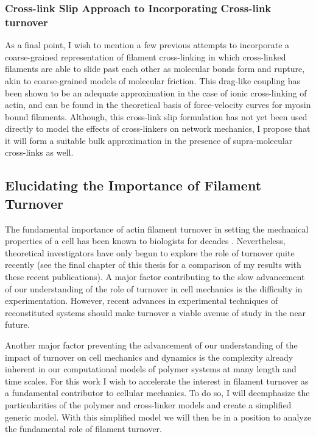 \subsubsection{Cross-link Slip Approach to Incorporating Cross-link turnover}

As a final point, I wish to mention a few previous attempts to incorporate a coarse-grained representation of filament cross-linking in which cross-linked filaments are able to slide past each other as molecular bonds form and rupture, akin to coarse-grained models of molecular friction\cite{theo_friction,theo_frictionSam,theo_molefric}.  This drag-like coupling has been shown to be an adequate approximation in the case of ionic cross-linking of actin\cite{mol_fric,theo_hydroish2}, and can be found in the theoretical basis of force-velocity curves for myosin bound filaments\cite{theo_frictionShila}. Although, this cross-link slip formulation has not yet been used directly to model the effects of cross-linkers on network mechanics, I propose that it will form a suitable bulk approximation in the presence of supra-molecular cross-links as well.

\subsection{Elucidating the Importance of Filament Turnover}

The fundamental importance of actin filament turnover in setting the mechanical properties of a cell has been known to biologists for decades \cite{FEB2:FEB20014579387815132}. Nevertheless, theoretical investigators have only begun to explore the role of turnover quite recently \cite{2015arXiv150706182H,Mak:2016aa,10.1371/journal.pone.0000696} (see the final chapter of this thesis for a comparison of my results with these recent publications). A major factor contributing to the slow advancement of our understanding of the role of turnover in cell mechanics is the difficulty in experimentation.  However, recent advances in experimental techniques of reconstituted systems should make turnover a viable avenue of study in the near future.  

Another major factor preventing the advancement of our understanding of the impact of turnover on cell mechanics and dynamics is the complexity already inherent in our computational models of polymer systems at many length and time scales\cite{Mak2015}. For this work I wish to accelerate the interest in filament turnover as a fundamental contributor to cellular mechanics.  To do so, I will deemphasize the particularities of the polymer and cross-linker models and create a simplified generic model.  With this simplified model we will then be in a position to analyze the fundamental role of filament turnover.


